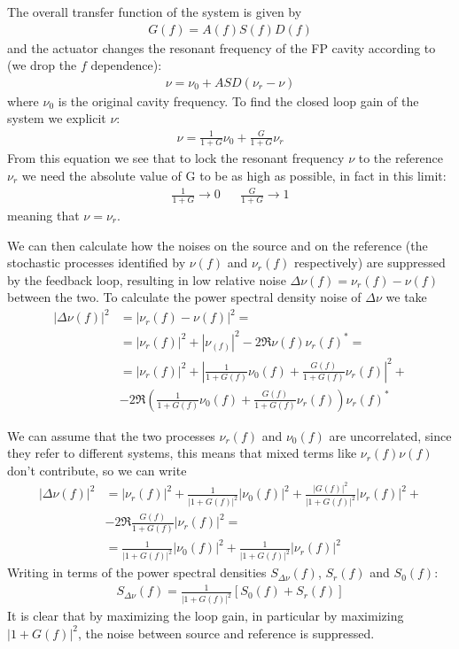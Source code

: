 The overall transfer function of the system is given by
\begin{align}
	G(f) = A(f)S(f)D(f)
\end{align}
and the actuator changes the resonant frequency of the FP cavity according to (we drop the $f$ dependence):
\begin{align}
	\nu = \nu_0 + ASD(\nu_r-\nu)
\end{align}
where $\nu_0$ is the original cavity frequency. To find the closed loop gain of the system we explicit $\nu$:
\begin{align}
	\nu = \frac{1}{1+G}\nu_0 + \frac{G}{1+G}\nu_r
\end{align}
From this equation we see that to lock the resonant frequency $\nu$ to the reference $\nu_r$ we need the absolute value of G to be as high as possible, in fact in this limit:
\begin{align}
	\frac{1}{1+G} \rightarrow 0 && \frac{G}{1+G} \rightarrow 1
\end{align}
meaning that $\nu=\nu_r$.

We can then calculate how the noises on the source and on the reference (the stochastic processes identified by $\nu(f)$ and $\nu_r(f)$ respectively) are suppressed by the feedback loop, resulting in low relative noise $\Delta\nu(f) = \nu_r(f) -\nu(f)$ between the two. To calculate the power spectral density noise of $\Delta\nu$ we take
\begin{align}
	|\Delta\nu(f)|^2 &= |\nu_r(f) - \nu(f)| ^ 2 =\\
			&= |\nu_r(f)|^2 + |\nu_(f)|^2 -2\Re{\nu(f)\nu_r(f)^*} = \\
			&= |\nu_r(f)|^2 + \left|\frac{1}{1+G(f)}\nu_0(f) + \frac{G(f)}{1+G(f)}\nu_r(f)\right|^2 +\\
			&- 2 \Re{\left(\frac{1}{1+G(f)}\nu_0(f)+\frac{G(f)}{1+G(f)}\nu_r(f)\right)\nu_r(f)^*}
\end{align}

We can assume that the two processes $\nu_r(f)$ and $\nu_0(f)$ are uncorrelated, since they refer to different systems, this means that mixed terms like $\nu_r(f)\nu(f)$ don't contribute, so we can write
\begin{align}
		|\Delta\nu(f)|^2 &= |\nu_r(f)|^2 + \frac{1}{\left|1+G(f)\right|^2}|\nu_0(f)|^2 + \frac{|G(f)|^2}{\left|1+G(f)\right|^2}|\nu_r(f)|^2 +\\ &-2\Re{\frac{G(f)}{1+G(f)}|\nu_r(f)|^2} = \\
		&=\frac{1}{\left|1+G(f)\right|^2}|\nu_0(f)|^2 + \frac{1}{\left|1+G(f)\right|^2}|\nu_r(f)|^2
\end{align}
Writing in terms of the power spectral densities $S_{\Delta\nu}(f)$, $S_{r}(f)$ and $S_{0}(f)$:
\begin{align}
S_{\Delta\nu}(f) = \frac{1}{\left|1+G(f)\right|^2} \left[S_{0}(f) + S_{r}(f)\right]
\end{align}
It is clear that by maximizing the loop gain, in particular by maximizing $\left|1+G(f)\right|^2$, the noise between source and reference is suppressed.

